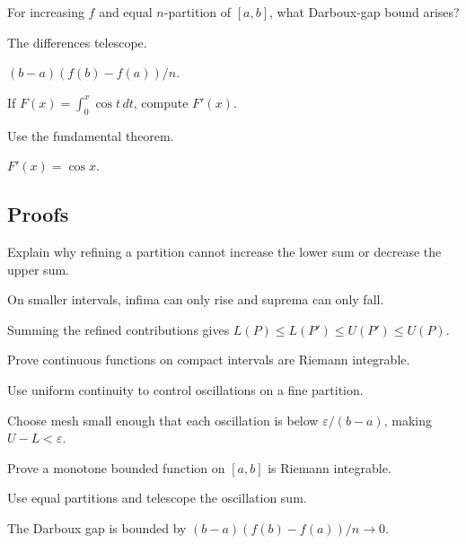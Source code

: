 \begin{exercise}\label{exr:ii10-expand-04}
For increasing \(f\) and equal \(n\)-partition of \([a,b]\), what Darboux-gap bound arises?
\end{exercise}
\begin{hint}
The differences telescope.
\end{hint}
\begin{solution}
\((b-a)(f(b)-f(a))/n\).
\end{solution}

\begin{exercise}[FTC]\label{exr:ii10-expand-05}
If \(F(x)=\int_0^x\cos t\,dt\), compute \(F'(x)\).
\end{exercise}
\begin{hint}
Use the fundamental theorem.
\end{hint}
\begin{solution}
\(F'(x)=\cos x\).
\end{solution}

\subsection*{Proofs}

\begin{exercise}\label{exr:ii10-expand-06}
Explain why refining a partition cannot increase the lower sum or decrease the upper sum.
\end{exercise}
\begin{hint}
On smaller intervals, infima can only rise and suprema can only fall.
\end{hint}
\begin{solution}
Summing the refined contributions gives \(L(P)\le L(P')\le U(P')\le U(P)\).
\end{solution}

\begin{exercise}\label{exr:ii10-expand-07}
Prove continuous functions on compact intervals are Riemann integrable.
\end{exercise}
\begin{hint}
Use uniform continuity to control oscillations on a fine partition.
\end{hint}
\begin{solution}
Choose mesh small enough that each oscillation is below \(\varepsilon/(b-a)\), making \(U-L<\varepsilon\).
\end{solution}

\begin{exercise}\label{exr:ii10-expand-08}
Prove a monotone bounded function on \([a,b]\) is Riemann integrable.
\end{exercise}
\begin{hint}
Use equal partitions and telescope the oscillation sum.
\end{hint}
\begin{solution}
The Darboux gap is bounded by \((b-a)(f(b)-f(a))/n\to0\).
\end{solution}

